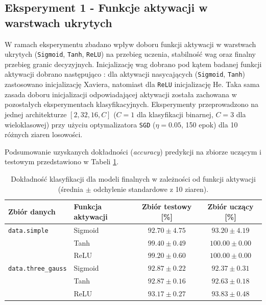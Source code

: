 \documentclass[11pt,a4paper]{article}
\begin{document}
\subsection{Eksperyment 1 - Funkcje aktywacji w warstwach ukrytych}
\label{sec:K1}

W ramach eksperymentu zbadano wpływ doboru funkcji aktywacji w warstwach ukrytych (\texttt{Sigmoid}, \texttt{Tanh}, \texttt{ReLU}) na przebieg uczenia,
stabilność wag oraz finalny przebieg granic decyzyjnych. 
Inicjalizację wag dobrano pod kątem badanej funkcji aktywacji dobrano następująco \cite{he_xavier_init}:
dla aktywacji nasycających (\texttt{Sigmoid}, \texttt{Tanh}) zastosowano inicjalizację Xaviera,
natomiast dla \texttt{ReLU} inicjalizację He. Taka sama zasada doboru inicjalizacji odpowiadającej aktywacji została zachowana w pozostałych eksperymentach klasyfikacyjnych.
Eksperymenty przeprowadzono na jednej architekturze $[2, 32, 16, C]$ ($C=1$ dla klasyfikacji binarnej, $C=3$ dla wieloklasowej) przy użyciu optymalizatora \texttt{SGD} ($\eta = 0.05$, 150 epok) dla 10 różnych ziaren losowości.

Podsumowanie uzyskanych dokładności (\textit{accuracy}) predykcji na zbiorze uczącym i testowym przedstawiono w Tabeli \ref{tab:k1_accuracy}.

\begin{table}[H]
    \centering
    \caption{Dokładność klasyfikacji dla modeli finalnych w zależności od funkcji aktywacji (średnia $\pm$ odchylenie standardowe z 10 ziaren).}
    \label{tab:k1_accuracy}
    \begin{tabular}{llcc}
        \toprule
        \textbf{Zbiór danych} & \textbf{Funkcja aktywacji} & \textbf{Zbiór testowy [\%]} & \textbf{Zbiór uczący [\%]} \\
        \midrule
        \texttt{data.simple}      & Sigmoid & $92.70 \pm 4.75$ & $93.20 \pm 4.19$ \\
                                  & Tanh    & $\mathbf{99.40} \pm 0.49$ & $100.00 \pm 0.00$ \\
                                  & ReLU    & $99.20 \pm 0.60$ & $100.00 \pm 0.00$ \\
        \midrule
        \texttt{data.three\_gauss} & Sigmoid & $92.87 \pm 0.22$ & $92.37 \pm 0.31$ \\
                                  & Tanh    & $92.87 \pm 0.16$ & $92.63 \pm 0.18$ \\
                                  & ReLU    & $\mathbf{93.17} \pm 0.27$ & $93.83 \pm 0.48$ \\
        \bottomrule
    \end{tabular}
\end{table}
\end{document}
